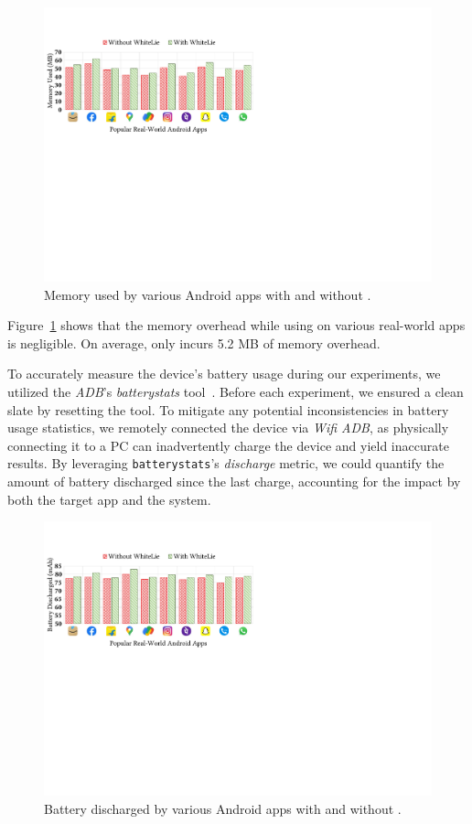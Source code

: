 \begin{figure}[t]
    \centering
    \includegraphics[width=0.8\linewidth]{Figures/Performance Evaluation/results_memory_used_target_app_real_world_apps.pdf}
    \caption{Memory used by various Android apps with and without \framework{}.}
    \label{fig:results_memUsedAll}
\end{figure}

Figure~\ref{fig:results_memUsedAll} shows that the memory overhead while using \framework{} on various real-world apps is negligible.  On average, \framework{} only incurs 5.2 MB of memory overhead. 

To accurately measure the device's battery usage during our experiments, we utilized the \textit{ADB}'s \textit{batterystats} tool~\cite{batterystats}. Before each experiment, we ensured a clean slate by resetting the tool. To mitigate any potential inconsistencies in battery usage statistics, we remotely connected the device via \textit{Wifi ADB}, as physically connecting it to a PC can inadvertently charge the device and yield inaccurate results.  By leveraging \texttt{batterystats}'s \textit{discharge} metric, we could quantify the amount of battery discharged since the last charge, accounting for the impact by both the target app and the system. 

\begin{figure}[t]
    \centering
    \includegraphics[width=0.8\linewidth]{Figures/Performance Evaluation/results_battery_discharged_real_world_apps.pdf}
    \caption{Battery discharged by various Android apps with and without \framework{}.}
    \label{fig:reslts_btryDschrgd}
\end{figure}

